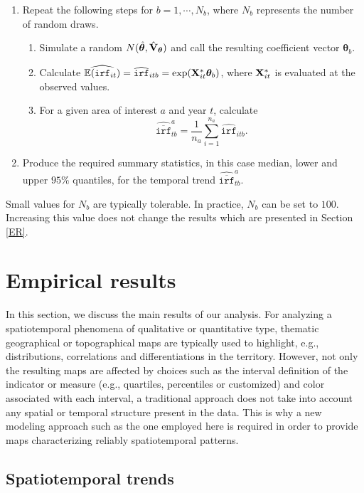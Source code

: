 \documentclass[10pt]{article}
\newcommand{\E}{\mathbb{E}}
\newcommand{\X}{{\bf X}}
\theoremstyle{definition}
\theoremstyle{plain}
\begin{document}
\begin{enumerate}
	\item Repeat the following steps for $b=1,\cdots,N_b$, where $N_b$ represents the number of random draws. 
	   \begin{enumerate}
	      \item Simulate a random $N(\hat{\bm\theta}, \hat{{\bf V}}_{\bm\theta} )$ and call the resulting coefficient vector $\bm\theta_b$.
	      \item Calculate $\widehat{\E(\texttt{irf}_{it})}=\widehat{\texttt{irf}}_{itb}=\exp(\X^*_{it}\bm\theta_b)$, where $\X^*_{it}$ is evaluated at the observed values. 
	      \item For a given area of interest $a$ and year $t$, calculate
	      $$\widehat{\overline{\texttt{irf}}}_{tb}^a=\frac{1}{n_a}\sum_{i=1}^{n_a} \widehat{\texttt{irf}}_{itb}.$$    
	   \end{enumerate}
	\item Produce the required summary statistics, in this case median, lower and upper $95\%$ quantiles, for the temporal trend $\widehat{\overline{\texttt{irf}}}_{tb}^a$.
\end{enumerate}
Small values for $N_b$ are typically tolerable. In practice, $N_b$ can be set to $100$. Increasing this value does not change the results which are presented in Section \ref{ER}.
 

\section{Empirical results \label{ER}}
In this section, we discuss the main results of our analysis. For analyzing a spatiotemporal phenomena of qualitative or quantitative type, thematic geographical or topographical maps are typically used to highlight, e.g., distributions, correlations and differentiations in the territory. However, not only the resulting maps are affected by choices such as the interval definition of the indicator or measure (e.g., quartiles, percentiles or customized) and color associated with each interval, a traditional approach does not take into account any spatial or temporal structure present in the data. This is why a new modeling approach such as the one employed here is required in order to provide maps characterizing reliably spatiotemporal patterns.


\subsection{Spatiotemporal trends \label{STT}}
\end{document}

